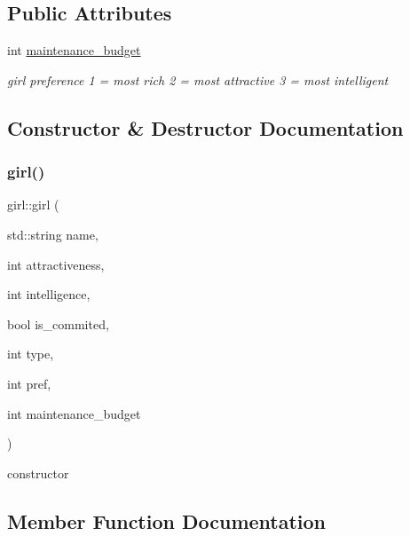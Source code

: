 \subsection*{Public Attributes}
\begin{DoxyCompactItemize}
\item 
int \hyperlink{classgirl_a0d038ec12424d8b11fa0442bfa6fe2d6}{maintenance\+\_\+budget}
\begin{DoxyCompactList}\small\item\em girl preference \textquotesingle{}1\textquotesingle{} = most rich \textquotesingle{}2\textquotesingle{} = most attractive \textquotesingle{}3\textquotesingle{} = most intelligent \end{DoxyCompactList}\end{DoxyCompactItemize}


\subsection{Constructor \& Destructor Documentation}
\mbox{\label{classgirl_a583ce9589214531dc92c46e9d0eebc75}} 
\subsubsection{\texorpdfstring{girl()}{girl()}}
{\footnotesize\ttfamily girl\+::girl (\begin{DoxyParamCaption}\item[{std\+::string}]{name,  }\item[{int}]{attractiveness,  }\item[{int}]{intelligence,  }\item[{bool}]{is\+\_\+commited,  }\item[{int}]{type,  }\item[{int}]{pref,  }\item[{int}]{maintenance\+\_\+budget }\end{DoxyParamCaption})}

constructor 

\subsection{Member Function Documentation}
\mbox{\label{classgirl_a25c8b2bc2d3df50ca61417f0e8c4eef5}} 
